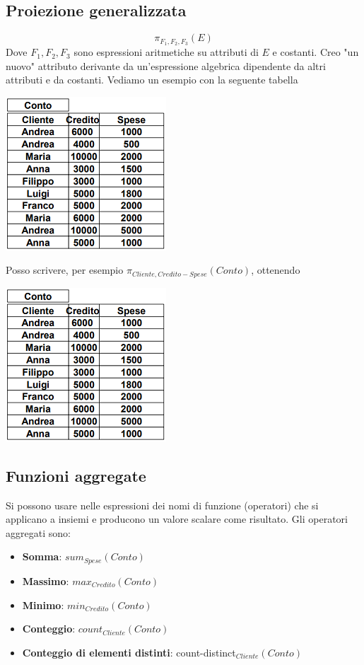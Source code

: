 \subsection{Proiezione generalizzata}
\[\pi_{F_1,F_2,F_3}(E)\]
Dove $F_1,F_2,F_3$ sono espressioni aritmetiche su attributi di $E$ e costanti. Creo "un nuovo" attributo derivante da un'espressione algebrica dipendente da altri attributi e da costanti. Vediamo un esempio con la seguente tabella
\begin{center}
	\includegraphics{images/62.PNG}
\end{center}
Posso scrivere, per esempio $\pi_{Cliente,Credito-Spese}(Conto)$, ottenendo
\begin{center}
	\includegraphics{images/62.PNG}
\end{center}
\subsection{Funzioni aggregate}
Si possono usare nelle espressioni dei nomi di funzione (operatori) che si applicano a insiemi e producono un valore scalare come risultato. Gli operatori aggregati sono:
\begin{itemize}
	\item \textbf{Somma}: $sum_{Spese}(Conto)$
	\item \textbf{Massimo}: $max_{Credito}(Conto)$
	\item \textbf{Minimo}: $min_{Credito}(Conto)$
	\item \textbf{Conteggio}: $count_{Cliente}(Conto)$
	\item \textbf{Conteggio di elementi distinti}: count-distinct$_{Cliente}(Conto)$
\end{itemize}
